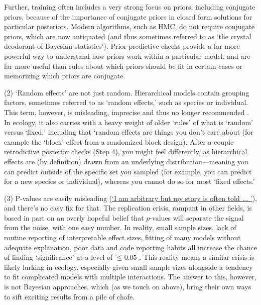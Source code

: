 \documentclass[11pt]{article}
\begin{document}
Further, training often includes a very strong focus on priors, including conjugate priors, because of the importance of conjugate priors in closed form solutions for particular posteriors. Modern algorithms, such as HMC, do not require conjugate priors, which are now antiquated (and thus sometimes referred to as  `the crystal deodorant of Bayesian statistics'). Prior predictive checks provide a far more powerful way to understand how priors work within a particular model, and are far more useful than rules about which priors should be fit in certain cases or memorizing which priors are conjugate. 

(2) `Random effects' are not just random. Hierarchical models contain grouping factors, sometimes referred to as `random effects,' such as species or individual. This term, however, is misleading, imprecise and thus no longer recommended \citep{gelmanhill}. In ecology, it also carries with a heavy weight of older `rules' of what is `random' versus `fixed,' including that `random effects are things you don't care about (for example the `block' effect from a randomized block design). After a couple retrodictive posterior checks (Step 4), you might feel differently, as hierarchical effects are (by definition) drawn from an underlying distribution---meaning you can predict outside of the specific set you sampled (for example, you can predict for a new species or individual), whereas you cannot do so for most `fixed effects.' 

(3) P-values are easily misleading (\href{https://www.youtube.com/watch?v=c3hxhv0lpI0}{`I am arbitrary but my story is often told ... '}), and there's no easy fix for that. The replication crisis, rampant in other fields, is based in part on an overly hopeful belief that $p$-values will separate the signal from the noise, with one easy number. In reality, small sample sizes, lack of routine reporting of interpretable effect sizes, fitting of many models without adequate explanation, poor data and code reporting habits all increase the chance of finding `significance' at a level of $\le0.05$ \citep{halsey2015,loken2017}. This reality means a similar crisis is likely lurking in ecology, especially given small sample sizes alongside a tendency to fit complicated models with multiple interactions. The answer to this, however, is not Bayesian approaches, which (as we touch on above), bring their own ways to sift exciting results from a pile of chafe. 
\end{document}
